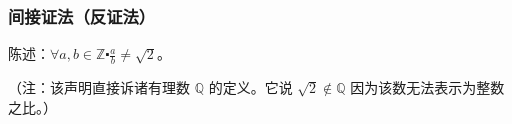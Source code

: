 \subsubsection*{间接证法（反证法）}

\begin{center}
    \noindent {}
\end{center}

\begin{example}

    陈述：$ \forall a, b \in \mathbb{Z} \centerdot \frac{a}{b} \ne \sqrt{2}$。

    （注：该声明直接诉诸有理数 $\mathbb{Q}$ 的定义。它说 $\sqrt{2} \notin \mathbb{Q}$ 因为该数无法表示为整数之比。）
\end{example}

